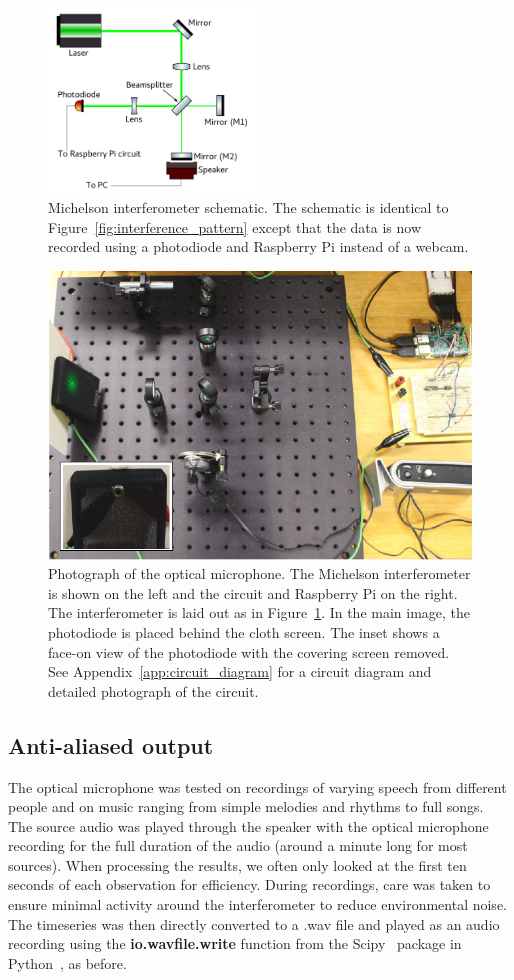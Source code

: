 \documentclass[paper-main.tex]{subfiles}
\begin{document}
\begin{figure}
	\includegraphics[width=0.49\textwidth]{figures/ifo_schematic_photodiode_edit.pdf}
	\caption{
Michelson interferometer schematic. 
The schematic is identical to Figure~\ref{fig:interference_pattern} except that the data is now recorded using a photodiode and Raspberry Pi instead of a webcam. 
}
	\label{fig:ifo_schematic_podo}
\end{figure}

\begin{figure}
	\includegraphics[width=.6\textwidth]{figures/setup_pic2.pdf}
\caption{Photograph of the optical microphone. The Michelson interferometer is shown on the left and the circuit and Raspberry Pi on the right. The interferometer is laid out as in Figure~\ref{fig:ifo_schematic_podo}. In the main image, the photodiode is placed behind the cloth screen. The inset shows a face-on view of the photodiode with the covering screen removed. See Appendix~\ref{app:circuit_diagram} for a circuit diagram and detailed photograph of the circuit.}
	\label{fig:setup_pic2}
\end{figure}


\subsection{Anti-aliased output}
\label{sec:initialResultsOpMic}
The optical microphone was tested on recordings of varying speech from different people and on music ranging from simple melodies and rhythms to full songs. 
The source audio was played through the speaker with the optical microphone recording for the full duration of the audio (around a minute long for most sources). When processing the results, we often only looked at the first ten seconds of each observation for efficiency.
During recordings, care was taken to ensure minimal activity around the interferometer to reduce environmental noise. 
The timeseries was then directly converted to a .wav file and played as an audio recording using the \textbf{io.wavfile.write} function from the Scipy~\cite{scipy} package in Python~\cite{python}, as before.
\end{document}
